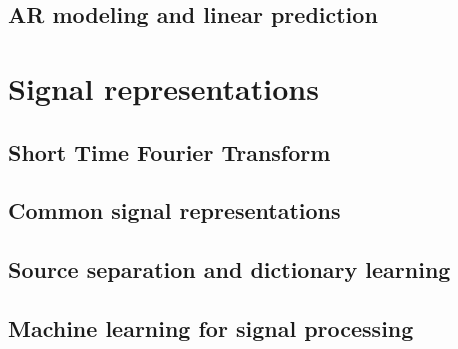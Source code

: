 \documentclass[a4paper, 10pt, dvipsnames]{book}
\begin{document}
\section{AR modeling and linear prediction}
\label{sec:ar_linear}

\chapter{Signal representations}
\label{chap:sig_representations}

\section{Short Time Fourier Transform}
\label{sec:stft}

\section{Common signal representations}
\label{sec:comon_signal_rep}

\section{Source separation and dictionary learning}
\label{sec:dl}


\section{Machine learning for signal processing}
\label{sec:mlsp}


\ForceHTMLPage





\ForceHTMLPage
\printindex
{}
\end{document}
